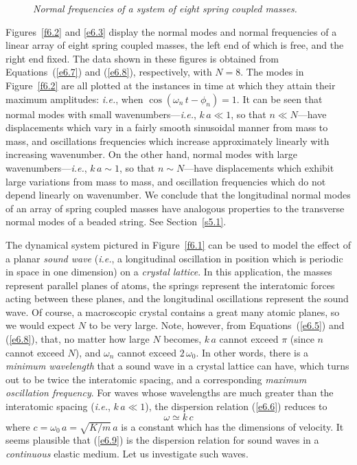 \begin{figure}
\epsfysize=3in
\centerline{}
\caption{\em Normal frequencies of a system of eight spring coupled
masses.}\label{f6.3}   
\end{figure}

Figures~\ref{f6.2} and \ref{e6.3} display the normal modes and normal
frequencies of a linear array of eight  spring coupled masses, the left end of which is free, and
the right end fixed. The data shown in these figures is obtained from Equations~(\ref{e6.7}) and (\ref{e6.8}), respectively, with $N=8$.
The modes in Figure~\ref{f6.2} are all plotted at the instances in time at which they
attain their maximum amplitudes: {\em i.e.}, when $\cos(\omega_n\,t-\phi_n)=1$. 
It can be seen that
normal modes with small wavenumbers---{\em i.e.}, $k\,a\ll 1$, so that $n\ll N$---have  displacements
which vary in  a fairly smooth sinusoidal manner from mass to mass, and oscillations frequencies
which increase approximately linearly with  increasing wavenumber.  
On the
other hand, normal modes with large wavenumbers---{\em i.e.}, $k\,a\sim 1$, so that $n\sim N$---have
displacements which exhibit large variations from mass to mass, and
 oscillation frequencies which do not depend linearly on wavenumber. We conclude that
 the longitudinal normal modes of an array of spring coupled masses have analogous  properties 
 to the transverse normal modes of a beaded string. See Section~\ref{s5.1}.

The dynamical system pictured in Figure~\ref{f6.1} can be used to model the effect of a  planar {\em sound wave}\/   ({\em i.e.}, a longitudinal
oscillation in position which is periodic in space in one dimension) on a {\em crystal lattice}. In this application, the masses represent parallel planes of atoms, the springs represent the interatomic forces acting between these planes, and the
longitudinal oscillations  represent the sound wave. Of course, a macroscopic crystal
contains a great many atomic planes, so we would expect $N$ to be very large.
Note, however,  from Equations~(\ref{e6.5}) and (\ref{e6.8}), that,
no matter how large $N$ becomes, $k\,a$ cannot exceed $\pi$ (since $n$ cannot exceed $N$), and $\omega_n$
cannot exceed $2\,\omega_0$. In other words, there is a {\em minimum wavelength}\/ that 
a sound wave  in a crystal lattice can have, which turns out to be twice the
interatomic spacing, and  a corresponding {\em maximum oscillation frequency}.
For waves whose wavelengths are much greater than the interatomic spacing ({\em i.e.}, $k\,a\ll 1$), the dispersion relation (\ref{e6.6}) reduces to
\begin{equation}\label{e6.9}
\omega\simeq k\,c
\end{equation}
where $c=\omega_0\,a=\sqrt{K/m}\,a$ is a constant which has the dimensions of velocity.
It seems plausible that (\ref{e6.9}) is the dispersion
relation for sound waves in a {\em continuous}\/ elastic medium. Let us investigate such waves.

